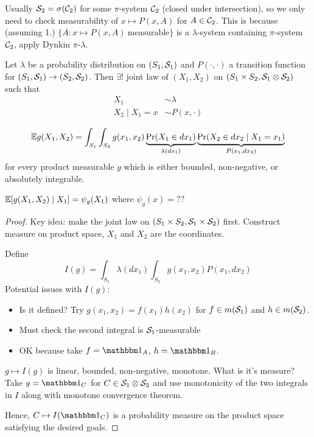 Usually $\mathcal{S}_2 = \sigma(\mathcal{C}_2)$ for some $\pi$-system
$\mathcal{C}_2$ (closed under intersection), so we only need to check
measurability of $x \mapsto P(x, A)$ for $A \in \mathcal{C}_2$. This is because
(assuming 1.) $\{A : x \mapsto P(x, A)~\text{measurable}\}$
is a $\lambda$-system containing $\pi$-system $\mathcal{C}_2$,
apply Dynkin $\pi$-$\lambda$.

\begin{theorem}
  Let $\lambda$ be a probability distribution on $(S_1, \mathcal{S}_1)$
  and $P(\cdot, \cdot)$ a transition function for $(S_1, \mathcal{S}_1) \to (S_2, \mathcal{S}_2)$.
  Then $\exists ! $ joint law of $(X_1, X_2)$ on
  $(S_1 \times S_2, \mathcal{S}_1 \otimes \mathcal{S}_2)$ such that
  \begin{align*}
    X_1 &\sim \lambda \\
    X_2 \mid X_1 = x &\sim P(x, \cdot)
  \end{align*}
\end{theorem}

\begin{theorem}[Fubini]
  \label{thm:fubini}
  \[
    \mathbb{E} g(X_1, X_2) = \int_{S_1} \int_{S_2} g(x_1, x_2)
    \underbrace{\Pr(X_1 \in dx_1)}_{\lambda(dx_1)}
    \underbrace{\Pr(X_2 \in dx_2 \mid X_1 = x_1)}_{P(x_1, dx_2)}
  \]
  for every product measurable $g$ which is either bounded, non-negative, or
  absolutely integrable.
\end{theorem}

\begin{exercise}
  $\mathbb{E}[g(X_1, X_2) \mid X_1] = \psi_g(X_1)$
  where $\psi_g(x) = ??$
\end{exercise}

\begin{proof}[Proof]
  Key idea: make the joint law on $(S_1 \times S_2, \mathcal{S}_1 \times \mathcal{S}_2)$
  first. Construct measure on product space, $X_1$ and $X_2$ are the
  coordinates.

  Define
  \[
    I(g) = \int_{S_1} \lambda(dx_1) \int_{S_2} g(x_1, x_2) P(x_1, dx_2)
  \]
  Potential issues with $I(g)$:
  \begin{itemize}
    \item Is it defined? Try $g(x_1, x_2) = f(x_1) h(x_2)$
      for $f \in m(\mathcal{S}_1)$ and $h \in m(\mathcal{S}_2)$.
    \item Must check the second integral is $\mathcal{S}_1$-measurable
    \item OK because take $f = \ind_A$, $h = \ind_B$.
  \end{itemize}

  $g \mapsto I(g)$ is linear, bounded, non-negative, monotone.
  What is it's measure? Take $g = \ind_C$ for $C \in \mathcal{S}_1 \otimes \mathcal{S}_2$
  and use monotonicity of the two integrals in $I$ along with monotone
  convergence theorem.

  Hence, $C \mapsto I(\ind_C)$ is a probability measure on
  the product space satisfying the desired goals.
\end{proof}

